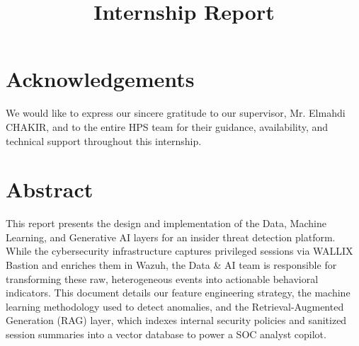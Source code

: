 \documentclass{classeENS}
\title{Internship Report}
\begin{document}
\departement{} %
\eleves{} %

\fairepagedegarde

\pagestyle{plain}

\section*{Acknowledgements}
We would like to express our sincere gratitude to our supervisor, Mr. Elmahdi CHAKIR, and to the entire HPS team for their guidance, availability, and technical support throughout this internship. %
\newpage

\section*{Abstract}

This report presents the design and implementation of the Data, Machine Learning, and Generative AI layers for an insider threat detection platform. While the cybersecurity infrastructure captures privileged sessions via WALLIX Bastion and enriches them in Wazuh, the Data \& AI team is responsible for transforming these raw, heterogeneous events into actionable behavioral indicators. This document details our feature engineering strategy, the machine learning methodology used to detect anomalies, and the Retrieval-Augmented Generation (RAG) layer, which indexes internal security policies and sanitized session summaries into a vector database to power a SOC analyst copilot.
\end{document}
